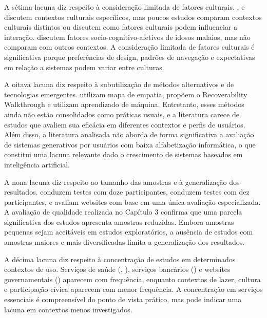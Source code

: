 A sétima lacuna diz respeito à consideração limitada de fatores culturais. \cite{dombrovskaia2021guideline}, \cite{ahmad2013teaching} e \cite{nosseir2011novice} discutem contextos culturais específicos, mas poucos estudos comparam contextos culturais distintos ou discutem como fatores culturais podem influenciar a interação. \cite{lee2021factors} discutem fatores socio-cognitivo-afetivos de idosos malaios, mas não comparam com outros contextos. A consideração limitada de fatores culturais é significativa porque preferências de design, padrões de navegação e expectativas em relação a sistemas podem variar entre culturas.

A oitava lacuna diz respeito à subutilização de métodos alternativos e de tecnologias emergentes. \cite{allah2021empathy} utilizam mapa de empatia, \cite{filgueiras2009recoverability} propõem o Recoverability Walkthrough e \cite{sadeghi2020hci} utilizam aprendizado de máquina. Entretanto, esses métodos ainda não estão consolidados como práticas usuais, e a literatura carece de estudos que avaliem sua eficácia em diferentes contextos e perfis de usuários. Além disso, a literatura analisada não aborda de forma significativa a avaliação de sistemas generativos por usuários com baixa alfabetização informática, o que constitui uma lacuna relevante dado o crescimento de sistemas baseados em inteligência artificial.

A nona lacuna diz respeito ao tamanho das amostras e à generalização dos resultados. \cite{gatsou2017seniors} conduzem testes com doze participantes, \cite{xie2010usability} conduzem testes com dez participantes, e \cite{dombrovskaia2021guideline} avaliam websites com base em uma única avaliação especializada. A avaliação de qualidade realizada no Capítulo 3 confirma que uma parcela significativa dos estudos apresenta amostras reduzidas. Embora amostras pequenas sejam aceitáveis em estudos exploratórios, a ausência de estudos com amostras maiores e mais diversificadas limita a generalização dos resultados.

A décima lacuna diz respeito à concentração de estudos em determinados contextos de uso. Serviços de saúde (\cite{barron2013feasibility}, \cite{health_problem_solving}), serviços bancários (\cite{gatsou2017seniors}) e websites governamentais (\cite{health_problem_solving}) aparecem com frequência, enquanto contextos de lazer, cultura e participação cívica aparecem com menor frequência. A concentração em serviços essenciais é compreensível do ponto de vista prático, mas pode indicar uma lacuna em contextos menos investigados.

